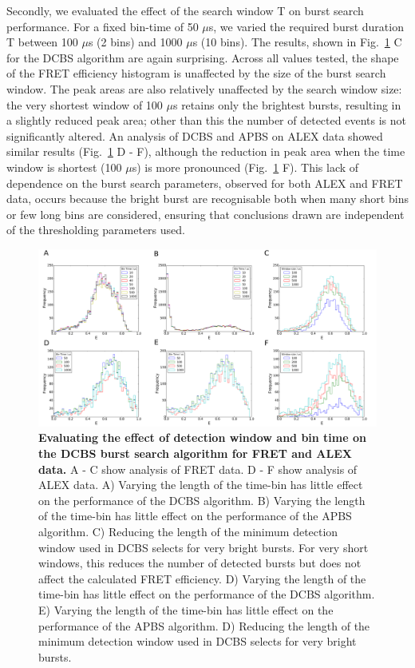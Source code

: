 Secondly, we evaluated the effect of the search window T on burst search performance. For a fixed bin-time of 50 $\mu$s, we varied the required burst duration T between 100 $\mu$s (2 bins) and 1000 $\mu$s (10 bins). The results, shown in Fig.~\ref{fig:fig7_binning} C for the DCBS algorithm are again surprising. Across all values tested, the shape of the FRET efficiency histogram is unaffected by the size of the burst search window. The peak areas are also relatively unaffected by the search window size: the very shortest window of 100 $\mu$s retains only the brightest bursts, resulting in a slightly reduced peak area; other than this the number of detected events is not significantly altered. An analysis of DCBS and APBS on ALEX data showed similar results (Fig.~\ref{fig:fig7_binning} D - F), although the reduction in peak area when the time window is shortest (100 $\mu$s) is more pronounced (Fig.~\ref{fig:fig7_binning} F). This lack of dependence on the burst search parameters, observed for both ALEX and FRET data, occurs because the bright burst are recognisable both when many short bins or few long bins are considered, ensuring that conclusions drawn are independent of the thresholding parameters used.

\begin{figure}[!ht]
   \begin{center}
      \includegraphics*[clip=true, width=6in]{pyFRET/window_effect.pdf}
      \caption{{\bf Evaluating the effect of detection window and bin time on the DCBS burst search algorithm for FRET and ALEX data.} A - C show analysis of FRET data. D - F show analysis of ALEX data. A) Varying the length of the time-bin has little effect on the performance of the DCBS algorithm. B) Varying the length of the time-bin has little effect on the performance of the APBS algorithm. C) Reducing the length of the minimum detection window used in DCBS selects for very bright bursts. For very short windows, this reduces the number of detected bursts but does not affect the calculated FRET efficiency. D) Varying the length of the time-bin has little effect on the performance of the DCBS algorithm. E) Varying the length of the time-bin has little effect on the performance of the APBS algorithm. D) Reducing the length of the minimum detection window used in DCBS selects for very bright bursts.}
      \label{fig:fig7_binning}
   \end{center}
\end{figure}

